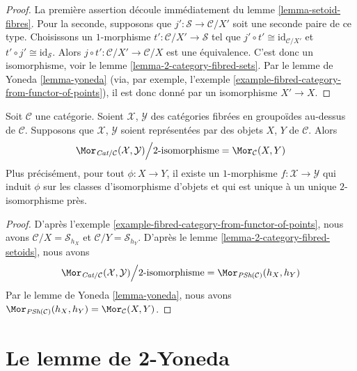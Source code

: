 \begin{proof}
La première assertion découle immédiatement du
lemme \ref{lemma-setoid-fibres}.
Pour la seconde, supposons que $j' : \mathcal{S} \to \mathcal{C}/X'$ soit
une seconde paire de ce type. Choisissons un $1$-morphisme
$t' : \mathcal{C}/X' \to \mathcal{S}$ tel que
$j' \circ t' \cong \text{id}_{\mathcal{C}/X'}$ et
$t' \circ j' \cong \text{id}_\mathcal{S}$. Alors
$j \circ t' : \mathcal{C}/X' \to \mathcal{C}/X$ est une équivalence.
C'est donc un isomorphisme, voir le lemme \ref{lemma-2-category-fibred-sets}.
Par le lemme de Yoneda \ref{lemma-yoneda} (via, par exemple,
l'exemple \ref{example-fibred-category-from-functor-of-points}),
il est donc donné par un isomorphisme $X' \to X$.
\end{proof}

\begin{lemma}
\label{lemma-morphisms-representable-fibred-categories}
Soit $\mathcal{C}$ une catégorie.
Soient $\mathcal{X}$, $\mathcal{Y}$ des catégories fibrées en groupoïdes
au-dessus de $\mathcal{C}$. Supposons que $\mathcal{X}$, $\mathcal{Y}$
soient représentées par des objets $X$, $Y$ de $\mathcal{C}$.
Alors
$$
\Mor_{\textit{Cat}/\mathcal{C}}(\mathcal{X}, \mathcal{Y})
\Big/
2\text{-isomorphisme}
=
\Mor_\mathcal{C}(X, Y)
$$
Plus précisément, pour tout $\phi : X \to Y$, il existe un
$1$-morphisme $f : \mathcal{X} \to \mathcal{Y}$ qui induit
$\phi$ sur les classes d'isomorphisme d'objets et
qui est unique à un unique $2$-isomorphisme près.
\end{lemma}

\begin{proof}
D'après
l'exemple \ref{example-fibred-category-from-functor-of-points},
nous avons $\mathcal{C}/X = \mathcal{S}_{h_X}$ et
$\mathcal{C}/Y = \mathcal{S}_{h_Y}$. D'après le
lemme \ref{lemma-2-category-fibred-setoids},
nous avons
$$
\Mor_{\textit{Cat}/\mathcal{C}}(\mathcal{X}, \mathcal{Y})
\Big/
2\text{-isomorphisme}
=
\Mor_{\textit{PSh}(\mathcal{C})}(h_X, h_Y)
$$
Par le lemme de Yoneda
\ref{lemma-yoneda},
nous avons $\Mor_{\textit{PSh}(\mathcal{C})}(h_X, h_Y)
= \Mor_\mathcal{C}(X, Y)$.
\end{proof}








\section{Le lemme de 2-Yoneda}
\label{section-2-yoneda}

